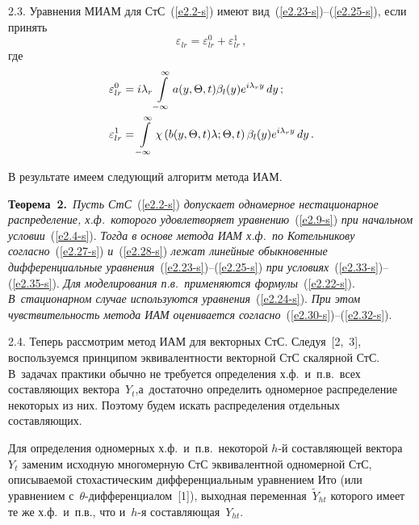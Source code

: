 \begin{multicols}{2}
\smallskip

2.3. Уравнения МИАМ для СтС~(\ref{e2.2-s}) имеют вид~(\ref{e2.23-s})--(\ref{e2.25-s}), 
если принять
\begin{equation}
\varepsilon_{lr} = \varepsilon_{lr}^0 + \varepsilon_{lr}^1\,,\label{e2.33-s}
\end{equation}
где
\begin{align}
\varepsilon_{lr}^0 &= i \lambda_r \iin a (y, \Theta,t) \beta_l (y) 
    e^{i\la_r y} \,dy\,; \notag %
    \\
\varepsilon_{lr}^1 &= \iin \chi\left( b(y,\Theta, t)\lambda;\Theta,t\right) \beta_l (y) 
    e^{i\lambda_r y}\, dy\,.\label{e2.35-s}
    \end{align}

В результате имеем следующий алгоритм метода ИАМ.

\smallskip

\noindent
\textbf{Теорема~2.}\ \textit{Пусть СтС}~(\ref{e2.2-s}) 
\textit{допускает одномерное нестационарное распределение, х.ф.\
которого удовлетворяет уравнению}~(\ref{e2.9-s}) \textit{при начальном условии}~(\ref{e2.4-s}).
\textit{Тогда в основе метода ИАМ х.ф.\ по Котельникову согласно}~(\ref{e2.27-s}) 
\textit{и}~(\ref{e2.28-s}) \textit{лежат линейные обыкновенные дифференциальные 
уравнения}~(\ref{e2.23-s})--(\ref{e2.25-s}) 
\textit{при условиях}~(\ref{e2.33-s})--(\ref{e2.35-s}). 
\textit{Для моделирования п.в.\ применяются формулы}~(\ref{e2.22-s}). 
\textit{В~стационарном случае используются 
уравнения}~(\ref{e2.24-s}). \textit{При этом чувствительность метода ИАМ оценивается 
согласно}~(\ref{e2.30-s})--(\ref{e2.32-s}).

\smallskip

2.4. Теперь рассмотрим метод ИАМ для векторных СтС.
Следуя~[2,~3], воспользуемся принципом эквивалентности векторной СтС скалярной СтС. 
В~задачах практики обычно не требуется определения х.ф.\ и~п.в.\
 всех составляющих вектора~$Y_t$,\linebreak а~достаточно определить одномерное распределение 
 некоторых из них. Поэтому будем искать распределения отдельных составляющих. 
 
 Для определения одномерных х.ф.\ и~п.в.\ некоторой $h$-й
  составляющей вектора~$Y_t$
 заменим исход\-ную многомерную СтС эквивалентной одномерной СтС, описываемой 
 стохастическим дифференциальным уравнением Ито (или уравнением 
 с~$\theta$-дифференци\-алом~[1]), выходная переменная~$\tilde Y_{ht}$ 
 которого имеет те же х.ф.\ и~п.в., что и~$h$-я со\-став\-ля\-ющая~$Y_{ht}$.
 


\end{multicols}
